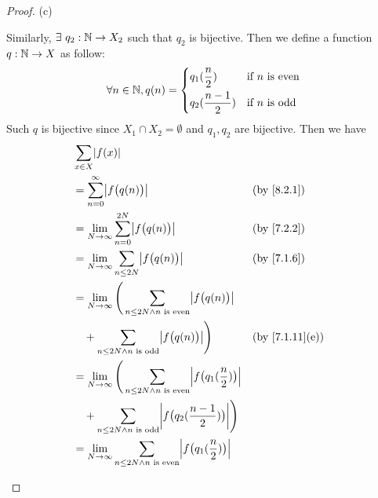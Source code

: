 \begin{proof}{(c)}
\begin{itemize}
          Similarly, \(\exists\ q_2 : \mathbb{N} \to X_2\) such that \(q_2\) is bijective.
          Then we define a function \(q : \mathbb{N} \to X\) as follow:
          \[
            \forall n \in \mathbb{N}, q(n) = \begin{dcases}
              q_1(\dfrac{n}{2})     & \text{if } n \text{ is even} \\
              q_2(\dfrac{n - 1}{2}) & \text{if } n \text{ is odd}
            \end{dcases}
          \]
          Such \(q\) is bijective since \(X_1 \cap X_2 = \emptyset\) and \(q_1, q_2\) are bijective.
          Then we have
          \begin{align*}
             & \sum_{x \in X} \abs{f(x)}                                                                                                                                   \\
             & = \sum_{n = 0}^\infty \abs{f\big(q(n)\big)}                                                                               &  & \text{(by \cref{8.2.1})}     \\
             & = \lim_{N \to \infty} \sum_{n = 0}^{2N} \abs{f\big(q(n)\big)}                                                             &  & \text{(by \cref{7.2.2})}     \\
             & = \lim_{N \to \infty} \sum_{n \leq 2N} \abs{f\big(q(n)\big)}                                                              &  & \text{(by \cref{7.1.6})}     \\
             & = \lim_{N \to \infty} \Bigg(\sum_{n \leq 2N \land n \text{ is even}} \abs{f\big(q(n)\big)}                                                                  \\
             & \quad + \sum_{n \leq 2N \land n \text{ is odd}} \abs{f\big(q(n)\big)}\Bigg)                                               &  & \text{(by \cref{7.1.11}(e))} \\
             & = \lim_{N \to \infty} \Bigg(\sum_{n \leq 2N \land n \text{ is even}} \abs{f\big(q_1(\dfrac{n}{2})\big)}                                                     \\
             & \quad + \sum_{n \leq 2N \land n \text{ is odd}} \abs{f\big(q_2(\dfrac{n - 1}{2})\big)}\Bigg)                                                                \\
             & = \lim_{N \to \infty} \sum_{n \leq 2N \land n \text{ is even}} \abs{f\big(q_1(\dfrac{n}{2})\big)}                                                           \\

\end{align*}
\end{itemize}
\end{proof}
